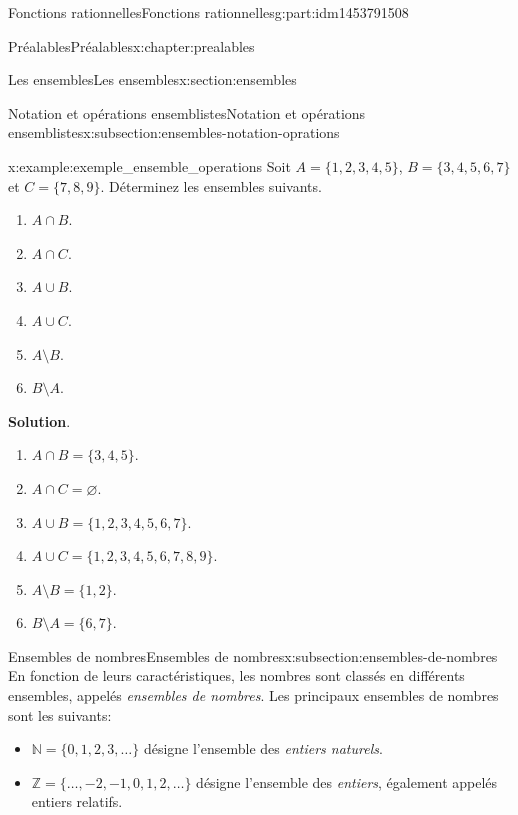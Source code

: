 \documentclass[oneside,10pt,]{book}
\newcommand{\blocktitlefont}{\relax}
\begin{document}
\begin{partptx}{Fonctions rationnelles}{}{Fonctions rationnelles}{}{}{g:part:idm1453791508}
\begin{chapterptx}{Préalables}{}{Préalables}{}{}{x:chapter:prealables}
\begin{sectionptx}{Les ensembles}{}{Les ensembles}{}{}{x:section:ensembles}
\begin{subsectionptx}{Notation et opérations ensemblistes}{}{Notation et opérations ensemblistes}{}{}{x:subsection:ensembles-notation-oprations}
\begin{equation*}
\end{equation*}
%
\begin{example}{}{x:example:exemple_ensemble_operations}%
Soit \(A = \{1,2,3,4,5\}\), \(B = \{3,4,5,6,7\}\) et \(C = \{7,8,9\}\). Déterminez les ensembles suivants.%
\par
%
\begin{multicols}{3}
\begin{enumerate}
\item{}\(A \cap B\).%
\item{}\(A \cap C\).%
\item{}\(A \cup B\).%
\item{}\(A \cup C\).%
\item{}\(A \setminus B\).%
\item{}\(B \setminus A\).%
\end{enumerate}
\end{multicols}
%
\par\smallskip%
\noindent\textbf{\blocktitlefont Solution}.\hypertarget{g:solution:idm1453720876}{}\quad{}%
\begin{enumerate}
\item{}\(A \cap B = \{3,4,5\}\).%
\item{}\(A \cap C = \varnothing\).%
\item{}\(A \cup B = \{1,2,3,4,5,6,7\}\).%
\item{}\(A \cup C = \{1,2,3,4,5,6,7,8,9\}\).%
\item{}\(A \setminus B = \{1,2\}\).%
\item{}\(B \setminus A = \{6,7\}\).%
\end{enumerate}
%
\end{example}
\end{subsectionptx}
%
%
\typeout{************************************************}
\typeout{************************************************}
%
\begin{subsectionptx}{Ensembles de nombres}{}{Ensembles de nombres}{}{}{x:subsection:ensembles-de-nombres}
En fonction de leurs caractéristiques, les nombres sont classés en différents ensembles, appelés \emph{ensembles de nombres}. Les principaux ensembles de nombres sont les suivants:%
\begin{itemize}[label=\textbullet]
\item{}\(\mathbb{N} = \{0,1,2,3,\ldots\}\) désigne l'ensemble des \emph{entiers naturels}.%
\item{}\(\mathbb{Z} = \{\ldots,-2,-1,0,1,2,\ldots\}\) désigne l'ensemble des \emph{entiers}, également appelés entiers relatifs.%

\end{itemize}
\end{subsectionptx}
\end{sectionptx}
\end{chapterptx}
\end{partptx}
\end{document}
